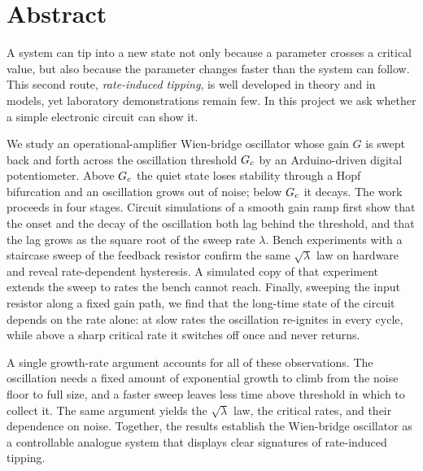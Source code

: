 \chapter*{Abstract}

A system can tip into a new state not only because a parameter crosses a critical value, but also
because the parameter changes faster than the system can follow. This second route, \emph{rate-induced
tipping}, is well developed in theory and in models, yet laboratory demonstrations remain few. In this
project we ask whether a simple electronic circuit can show it.

We study an operational-amplifier Wien-bridge oscillator whose gain $G$ is swept back and forth
across the oscillation threshold $G_{c}$ by an Arduino-driven digital potentiometer. Above $G_{c}$ the quiet
state loses stability through a Hopf bifurcation and an oscillation grows out of noise; below $G_{c}$ it
decays. The work proceeds in four stages. Circuit simulations of a smooth gain ramp first show that the
onset and the decay of the oscillation both lag behind the threshold, and that the lag grows as the
square root of the sweep rate $\lambda$. Bench experiments with a staircase sweep of the feedback
resistor confirm the same $\sqrt{\lambda}$ law on hardware and reveal rate-dependent hysteresis. A
simulated copy of that experiment extends the sweep to rates the bench cannot reach. Finally, sweeping
the input resistor along a fixed gain path, we find that the long-time state of the circuit depends on
the rate alone: at slow rates the oscillation re-ignites in every cycle, while above a sharp critical
rate it switches off once and never returns.

A single growth-rate argument accounts for all of these observations. The oscillation needs a fixed
amount of exponential growth to climb from the noise floor to full size, and a faster sweep leaves less
time above threshold in which to collect it. The same argument yields the $\sqrt{\lambda}$ law, the
critical rates, and their dependence on noise. Together, the results establish the Wien-bridge
oscillator as a controllable analogue system that displays clear signatures of rate-induced tipping.
